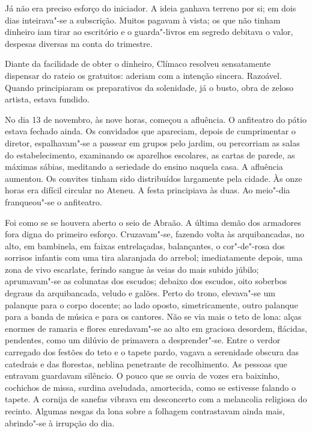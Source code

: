 Já não era preciso esforço do
iniciador. A ideia ganhava terreno por si; em dois dias inteirava"-se
a subscrição. Muitos pagavam à vista; os que não tinham dinheiro iam
tirar ao escritório e o guarda"-livros em segredo debitava o valor,
despesas diversas na conta do trimestre. 

Diante da facilidade de obter
o dinheiro, Clímaco resolveu sensatamente dispensar do rateio os
gratuitos: aderiam com a intenção sincera. Razoável. Quando
principiaram os preparativos da solenidade, já o busto, obra de zeloso
artista, estava fundido. 

No dia 13 de novembro, às nove horas, começou
a afluência. O anfiteatro do pátio estava fechado ainda. Os convidados
que apareciam, depois de cumprimentar o diretor, espalhavam"-se a
passear em grupos pelo jardim, ou percorriam as salas do
estabelecimento, examinando os aparelhos escolares, as cartas de
parede, as máximas sábias, meditando a seriedade do ensino naquela
casa. A afluência aumentou. Os convites tinham sido distribuídos
largamente pela cidade. Às onze horas era difícil circular no Ateneu. 
A festa principiava às duas. Ao meio"-dia franqueou"-se o anfiteatro.

Foi como se se houvera aberto o seio de Abraão. A última demão dos
armadores fora digna do primeiro esforço. Cruzavam"-se, fazendo volta
às arquibancadas, no alto, em bambinela, em faixas entrelaçadas,
balançantes, o cor"-de"-rosa dos sorrisos infantis com uma tira
alaranjada do arrebol; imediatamente depois, uma zona de vivo
escarlate, ferindo sangue às veias do mais subido júbilo;
aprumavam"-se as colunatas dos escudos; debaixo dos escudos, oito
soberbos degraus da arquibancada, veludo e galões. Perto do trono,
elevava"-se um palanque para o corpo docente; ao lado oposto,
simetricamente, outro palanque para a banda de música e para os
cantores. Não se via mais o teto de lona: alças enormes de ramaria e
flores enredavam"-se ao alto em graciosa desordem, flácidas,
pendentes, como um dilúvio de primavera a desprender"-se. Entre o
verdor carregado dos festões do teto e o tapete pardo, vagava a
serenidade obscura das catedrais e das florestas, neblina penetrante de
recolhimento. As pessoas que entravam guardavam silêncio. O pouco que
se ouvia de vozes era baixinho, cochichos de missa, surdina aveludada,
amortecida, como se estivesse falando o tapete. A cornija de sanefas
vibrava em desconcerto com a melancolia religiosa do recinto. Algumas
nesgas da lona sobre a folhagem contrastavam ainda mais, abrindo"-se à
irrupção do dia. 

